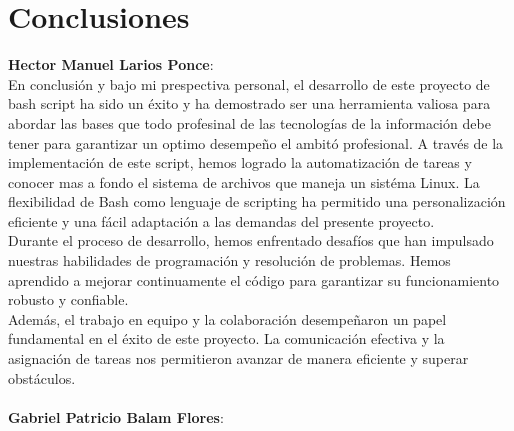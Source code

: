 \documentclass[titlepage]{article}
\begin{document}
\newpage
\section{Conclusiones}
\textbf{Hector Manuel Larios Ponce}:\\En conclusión y bajo mi prespectiva personal, el desarrollo de este proyecto de bash script ha sido un éxito y ha demostrado ser una herramienta valiosa para abordar las bases que todo profesinal de las tecnologías de la información debe tener para garantizar un optimo desempeño el ambitó profesional. A través de la implementación de este script, hemos logrado la automatización de tareas y conocer mas a fondo el sistema de archivos que maneja un sistéma Linux. La flexibilidad de Bash como lenguaje de scripting ha permitido una personalización eficiente y una fácil adaptación a las demandas del presente proyecto.\\Durante el proceso de desarrollo, hemos enfrentado desafíos que han impulsado nuestras habilidades de programación y resolución de problemas. Hemos aprendido a mejorar continuamente el código para garantizar su funcionamiento robusto y confiable.\\Además, el trabajo en equipo y la colaboración desempeñaron un papel fundamental en el éxito de este proyecto. La comunicación efectiva y la asignación de tareas nos permitieron avanzar de manera eficiente y superar obstáculos.
\\\\

\textbf{Gabriel Patricio Balam Flores}:\\
\end{document}
